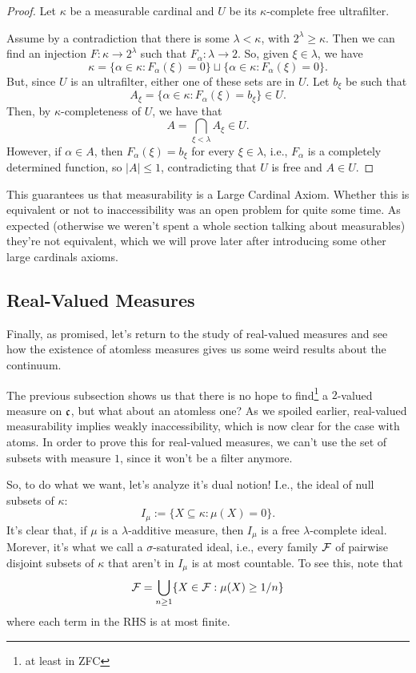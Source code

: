 \begin{proof}
    Let $\kappa$ be a measurable cardinal and $U$ be its $\kappa$-complete free ultrafilter.
    
    Assume by a contradiction that there is some $\lambda<\kappa$, with $2^\lambda\geq\kappa$. Then we can find an injection $F:\kappa\to2^\lambda$ such that $F_\alpha:\lambda\to2$. So, given $\xi\in\lambda$, we have
    $$\kappa=\{\alpha\in\kappa:F_\alpha(\xi)=0\}\sqcup\{\alpha\in\kappa:F_\alpha(\xi)=0\}.$$
    But, since $U$ is an ultrafilter, either one of these sets are in $U$. Let $b_\xi$ be such that
    $$A_\xi=\{\alpha\in\kappa:F_\alpha(\xi)=b_\xi\}\in U.$$
    Then, by $\kappa$-completeness of $U$, we have that
    $$A=\bigcap_{\xi<\lambda}A_\xi\in U.$$
    However, if $\alpha\in A$, then $F_\alpha(\xi)=b_\xi$ for every $\xi\in\lambda$, i.e., $F_\alpha$ is a completely determined function, so $\lvert A\rvert\leq 1$, contradicting that $U$ is free and $A\in U$.
\end{proof}

This guarantees us that measurability is a Large Cardinal Axiom. Whether this is equivalent or not to inaccessibility was an open problem for quite some time. As expected (otherwise we weren't spent a whole section talking about measurables) they're not equivalent, which we will prove later after introducing some other large cardinals axioms.

\subsection{Real-Valued Measures}

Finally, as promised, let's return to the study of real-valued measures and see how the existence of atomless measures gives us some weird results about the continuum.

The previous subsection shows us that there is no hope to find\footnote{at least in ZFC} a $2$-valued measure on $\mathfrak{c}$, but what about an atomless one? As we spoiled earlier, real-valued measurability implies weakly inaccessibility, which is now clear for the case with atoms. In order to prove this for real-valued measures, we can't use the set of subsets with measure $1$, since it won't be a filter anymore.

So, to do what we want, let's analyze it's dual notion! I.e., the ideal of null subsets of $\kappa$:
$$I_\mu:=\{X\subseteq\kappa:\mu(X)=0\}.$$
It's clear that, if $\mu$ is a $\lambda$-additive measure, then $I_\mu$ is a free $\lambda$-complete ideal. Morever, it's what we call a $\sigma$-saturated ideal, i.e., every family $\mathcal{F}$ of pairwise disjoint subsets of $\kappa$ that aren't in $I_\mu$ is at most countable. To see this, note that
$$\mathcal{F}=\bigcup_{n\geq1}\{X\in\mathcal{F}:\mu(X)\geq1/n\}$$
where each term in the RHS is at most finite.

